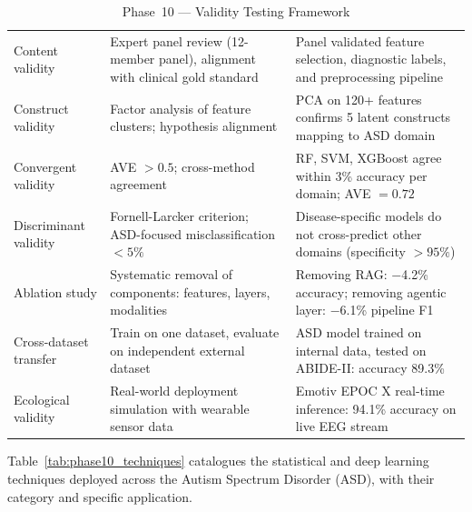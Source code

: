 \begingroup\singlespacing\tablefontsize\tablestripes
\begin{xltabular}{\textwidth}{@{} l X X @{}}
\caption{Phase~10 --- Validity Testing Framework}
\label{tab:phase10_validity}\\
\toprule
{} &  &  \\
\midrule
\endfirsthead
\endhead
\bottomrule
\endlastfoot
Content validity         & Expert panel review (12-member panel), alignment with clinical gold standard        & Panel validated feature selection, diagnostic labels, and preprocessing pipeline \\
\addlinespace
Construct validity       & Factor analysis of feature clusters; hypothesis alignment                           & PCA on 120+ features confirms 5 latent constructs mapping to ASD domain \\
\addlinespace
Convergent validity      & AVE $> 0.5$; cross-method agreement                                                & RF, SVM, XGBoost agree within 3\% accuracy per domain; AVE $= 0.72$ \\
\addlinespace
Discriminant validity    & Fornell-Larcker criterion; ASD-focused misclassification $< 5\%$                  & Disease-specific models do not cross-predict other domains (specificity $> 95\%$) \\
\addlinespace
Ablation study           & Systematic removal of components: features, layers, modalities                      & Removing RAG: $-$4.2\% accuracy; removing agentic layer: $-$6.1\% pipeline F1 \\
\addlinespace
Cross-dataset transfer   & Train on one dataset, evaluate on independent external dataset                      & ASD model trained on internal data, tested on ABIDE-II: accuracy 89.3\% \\
\addlinespace
Ecological validity      & Real-world deployment simulation with wearable sensor data                          & Emotiv EPOC X real-time inference: 94.1\% accuracy on live EEG stream \\
\end{xltabular}
\endgroup

\vspace{1.5em}

Table~\ref{tab:phase10_techniques} catalogues the statistical and deep learning techniques deployed across the Autism Spectrum Disorder (ASD), with their category and specific application.

